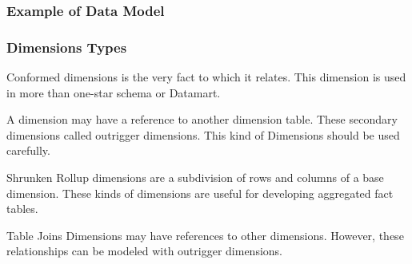 
\begin{frame}
\frametitle{Example of Data Model}


\end{frame}

\begin{frame}
\frametitle{Dimensions Types}


	\begin{description}[<+->]
		\item[Conformed Dimensions]	Conformed dimensions is the very fact to which it relates. This dimension is used in more than one-star schema or Datamart.
		\item[Outrigger Dimensions]	A dimension may have a reference to another dimension table. These secondary dimensions called outrigger dimensions. This kind of Dimensions should be used carefully.
		\item[Shrunken Rollup Dimensions]	Shrunken Rollup dimensions are a subdivision of rows and columns of a base dimension. These kinds of dimensions are useful for developing aggregated fact tables.
		\item[Dimension-to-Dimension] Table Joins	Dimensions may have references to other dimensions. However, these relationships can be modeled with outrigger dimensions.
	\end{description}
\end{frame}

